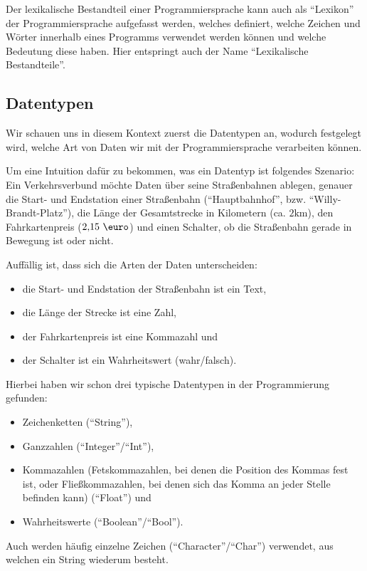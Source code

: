 Der lexikalische Bestandteil einer Programmiersprache kann auch als \enquote{Lexikon} der Programmiersprache aufgefasst werden, welches definiert, welche Zeichen und Wörter innerhalb eines Programms verwendet werden können und welche Bedeutung diese haben. Hier entspringt auch der Name \enquote{Lexikalische Bestandteile}.

\subsection{Datentypen} \functionalMark \imperativeMark \oopMark

	Wir schauen uns in diesem Kontext zuerst die Datentypen an, wodurch festgelegt wird, welche Art von Daten wir mit der Programmiersprache verarbeiten können.
	
	Um eine Intuition dafür zu bekommen, was ein Datentyp ist folgendes Szenario:
	Ein Verkehrsverbund möchte Daten über seine Straßenbahnen ablegen, genauer die Start- und Endstation einer Straßenbahn (\enquote{Hauptbahnhof}, bzw. \enquote{Willy-Brandt-Platz}), die Länge der Gesamtstrecke in Kilometern (ca. $ 2\text{km} $), den Fahrkartenpreis ($ 2,\!15\text{ \euro} $) und einen Schalter, ob die Straßenbahn gerade in Bewegung ist oder nicht.
	
	Auffällig ist, dass sich die Arten der Daten unterscheiden:
	\begin{itemize}
		\item die Start- und Endstation der Straßenbahn ist ein Text,
		\item die Länge der Strecke ist eine Zahl,
		\item der Fahrkartenpreis ist eine Kommazahl und
		\item der Schalter ist ein Wahrheitswert (wahr/falsch).
	\end{itemize}
	Hierbei haben wir schon drei typische Datentypen in der Programmierung gefunden:
	\begin{itemize}
		\item Zeichenketten (\enquote{String}),
		\item Ganzzahlen (\enquote{Integer}/\enquote{Int}),
		\item Kommazahlen (Fetskommazahlen, bei denen die Position des Kommas fest ist, oder Fließkommazahlen, bei denen sich das Komma an jeder Stelle befinden kann) (\enquote{Float}) und
		\item Wahrheitswerte (\enquote{Boolean}/\enquote{Bool}).
	\end{itemize}
	Auch werden häufig einzelne Zeichen (\enquote{Character}/\enquote{Char}) verwendet, aus welchen ein String wiederum besteht.
	
